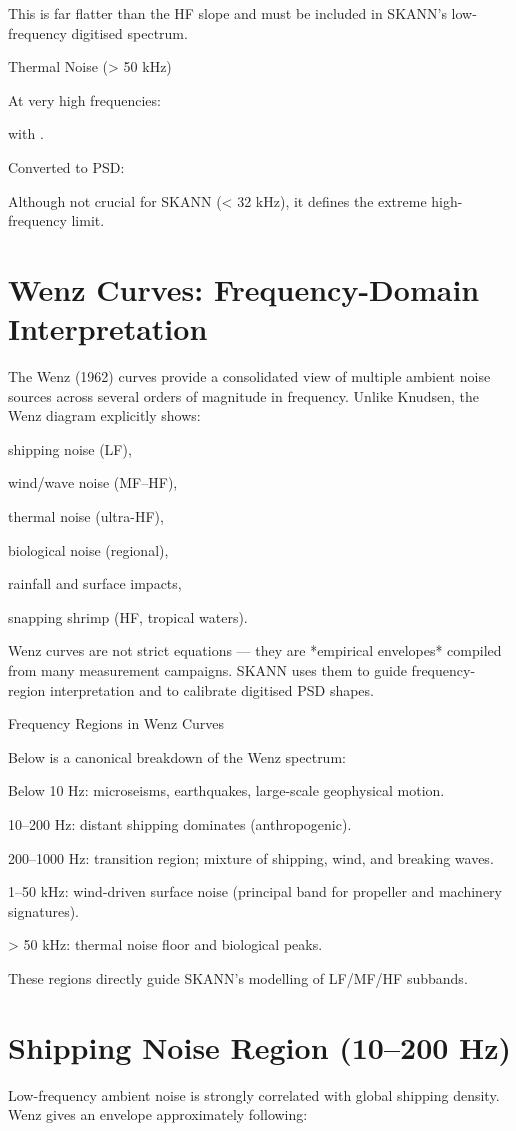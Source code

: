 \documentclass[12pt]{article}
\begin{document}
This is far flatter than the HF slope and must be included in SKANN’s low-frequency digitised spectrum.

Thermal Noise (> 50 kHz)

At very high frequencies:


with .

Converted to PSD:


Although not crucial for SKANN (< 32 kHz), it defines the extreme high-frequency limit.

\section*{Wenz Curves: Frequency-Domain Interpretation}
The Wenz (1962) curves provide a consolidated view of multiple ambient noise sources across several orders of magnitude in frequency. Unlike Knudsen, the Wenz diagram explicitly shows:

shipping noise (LF),

wind/wave noise (MF–HF),

thermal noise (ultra-HF),

biological noise (regional),

rainfall and surface impacts,

snapping shrimp (HF, tropical waters).

Wenz curves are not strict equations — they are *empirical envelopes* compiled from many measurement campaigns. SKANN uses them to guide frequency-region interpretation and to calibrate digitised PSD shapes.

Frequency Regions in Wenz Curves

Below is a canonical breakdown of the Wenz spectrum:

Below 10 Hz: microseisms, earthquakes, large-scale geophysical motion.

10–200 Hz: distant shipping dominates (anthropogenic).

200–1000 Hz: transition region; mixture of shipping, wind, and breaking waves.

1–50 kHz: wind-driven surface noise (principal band for propeller and machinery signatures).

> 50 kHz: thermal noise floor and biological peaks.

These regions directly guide SKANN’s modelling of LF/MF/HF subbands.

\section*{Shipping Noise Region (10–200 Hz)}
Low-frequency ambient noise is strongly correlated with global shipping density. Wenz gives an envelope approximately following:
\end{document}
